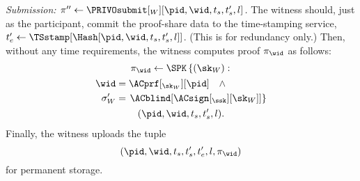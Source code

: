 \emph{Submission: \(\pi''\gets \PRIVOsubmit[_W][\pid, \wid, t_s, t_s', l]\).}
The witness should, just as the participant, commit the proof-share data to the 
time-stamping service, \(t_e'\gets \TSstamp[\Hash[\pid, \wid, t_s, t_s', l]]\).
(This is for redundancy only.)
Then, without any time requirements, the witness computes  proof 
\(\pi_{\wid}\) as follows:
\begin{multline*}
  \pi_{\wid}\gets \SPK\left\{ (\sk_W) : \right. \\
    \begin{aligned}
      \wid &= \ACprf[_{\sk_W}][\pid] \quad \land \\
      \sigma_W' &= \left. \ACblind[\ACsign[_{\ssk}][\sk_W]] \right\}
    \end{aligned} \\
      (\pid, \wid, t_s, t_s', l).
\end{multline*}
Finally, the witness uploads the tuple \[
  (\pid, \wid, t_s, t_s', t_e', l, \pi_{\wid})
\] for permanent storage.

